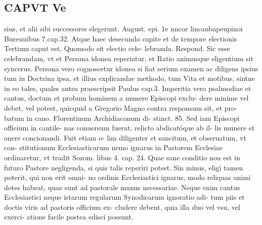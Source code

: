 \documentclass{article}
\begin{document}
\begin{pages}
\section*{CAPVT  Ve }
\marginpar{[ p.357 ]}\pstart sius, et alii sibi successores elegerunt. August. epi. 1e nncor lincanbapeupinoi Bureuuibus 7.cap.32. Atque  haec desecundo capite et de tempore electionis  \pend\pstart Tertium caput est, Quomodo sit electio cele- lebranda. Respond. Sic esse celebrandam, vt et Persona idonea reperiatur, et Ratio animusque eligentium sit syncerus.  \pend\pstart Persona vero cognoscetur idonea si fiat serium examen ac diligens ipsius tum in Doctrina ipsa, et illius explicandae methodo, tum Vita et motibus, sintne in eo tales, quales antea praescripsit Paulus cap.3.  \pend\pstart Imperitia vero psalmodiae et cantus, doctum et probum hominem a munere Episcopi exclu- dere minime vel debet, vel potest, quicquid a Gregorio Magno contra responsum sit, et pro- batum in cano. Florentinum Archidiaconum di- stinct. 85. Sed iam Episcopi officium in cantile- nas conuersum fuerat, relicto abdicatóque ab il- lis munere et onere concionandi. Fuit etiam o- lim diligenter et sancitum, et obseruatum, vt con- stitutionum Ecclesiasticarum nemo ignarus in Pastorem Ecclesiae ordinaretur, vt tradit Sozom. libus 4. cap. 24. Quae sane conditio non est in futuro Pastore negligenda, si quis talis reperiri potest. Sin minus, eligi tamen poterit, qui non erit omni- no ordinis Ecclesiastici ignarus, modo reliquas animi dotes habeat, quae sunt ad pastorale munus necessariae. Neque enim cantus Ecclesiastici neque  istarum regularum Synodicarum ignoratio adi- tum piis et doctis viris ad pastoris officium ex- cludere debent, quia illa duo vel vsu, vel exerci- atione facile postea edisci possunt.  \pend

\end{pages}
\end{document}
